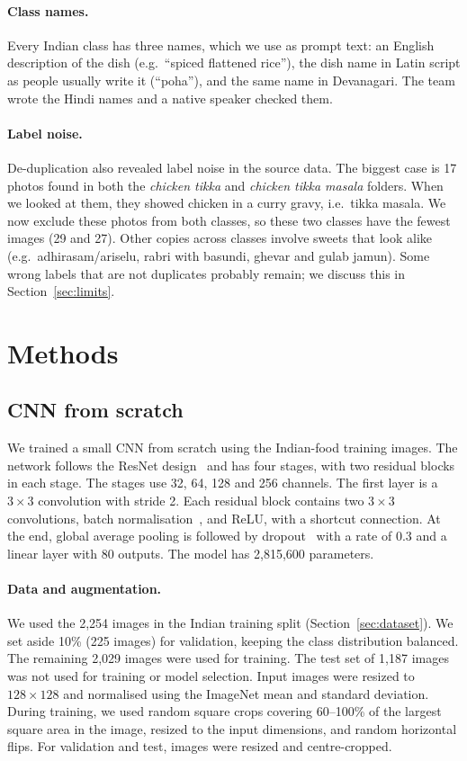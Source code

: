\documentclass[twoside,a4paper,11pt]{article}
\begin{document}
\paragraph{Class names.} Every Indian class has three names, which we use as prompt text: an English description of
the dish (e.g.\ ``spiced flattened rice''), the dish name in Latin script as people usually write it (``poha''), and
the same name in Devanagari. The team wrote the Hindi names and a native speaker checked them.

\paragraph{Label noise.} De-duplication also revealed label noise in the source data. The biggest case is 17 photos
found in both the \emph{chicken tikka} and \emph{chicken tikka masala} folders. When we looked at them, they showed
chicken in a curry gravy, i.e.\ tikka masala. We now exclude these photos from both classes, so these two classes have
the fewest images (29 and 27). Other copies across classes involve sweets that look alike (e.g.\ adhirasam/ariselu,
rabri with basundi, ghevar and gulab jamun). Some wrong labels that are not duplicates probably remain; we discuss this
in Section~\ref{sec:limits}.

\section{Methods}
\subsection{CNN from scratch}\label{sec:cnn-method}      %
We trained a small CNN from scratch using the Indian-food training images. The network follows the ResNet design~\cite{he2016resnet} and has four stages, with two residual blocks in each stage. The stages use 32, 64, 128 and 256 channels. The first layer is a $3\times3$ convolution with stride 2. Each residual block contains two $3\times3$ convolutions, batch normalisation~\cite{ioffe2015batchnorm}, and ReLU, with a shortcut connection. At the end, global average pooling is followed by dropout~\cite{srivastava2014dropout} with a rate of 0.3 and a linear layer with 80 outputs. The model has 2{,}815{,}600 parameters.

\paragraph{Data and augmentation.} We used the 2{,}254 images in the Indian training split (Section~\ref{sec:dataset}). We set aside 10\% (225 images) for validation, keeping the class distribution balanced. The remaining 2{,}029 images were used for training. The test set of 1{,}187 images was not used for training or model selection. Input images were resized to $128\times128$ and normalised using the ImageNet mean and standard deviation. During training, we used random square crops covering 60--100\% of the largest square area in the image, resized to the input dimensions, and random horizontal flips. For validation and test, images were resized and centre-cropped.
\end{document}
